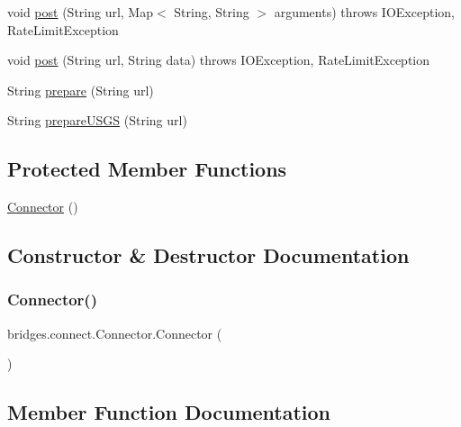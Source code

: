 \begin{DoxyCompactItemize}
\item 
void \hyperlink{classbridges_1_1connect_1_1_connector_a95fdd8c6455e49dbdf15f9ae8594ce23}{post} (String url, Map$<$ String, String $>$ arguments)  throws I\+O\+Exception, Rate\+Limit\+Exception 
\item 
void \hyperlink{classbridges_1_1connect_1_1_connector_ad1384f2afce76b32e0a465d94e1af213}{post} (String url, String data)  throws I\+O\+Exception,  								\+Rate\+Limit\+Exception 
\item 
String \hyperlink{classbridges_1_1connect_1_1_connector_a507ee5a9d8c812ffd4629cbd22f27373}{prepare} (String url)
\item 
String \hyperlink{classbridges_1_1connect_1_1_connector_aa0201e2569358ff906d3c14d654711e5}{prepare\+U\+S\+GS} (String url)
\end{DoxyCompactItemize}
\subsection*{Protected Member Functions}
\begin{DoxyCompactItemize}
\item 
\hyperlink{classbridges_1_1connect_1_1_connector_a167800699b2d191bd625d9c8c8cd9e6f}{Connector} ()
\end{DoxyCompactItemize}


\subsection{Constructor \& Destructor Documentation}
\hypertarget{classbridges_1_1connect_1_1_connector_a167800699b2d191bd625d9c8c8cd9e6f}{}\label{classbridges_1_1connect_1_1_connector_a167800699b2d191bd625d9c8c8cd9e6f} 
\subsubsection{\texorpdfstring{Connector()}{Connector()}}
{\footnotesize\ttfamily bridges.\+connect.\+Connector.\+Connector (\begin{DoxyParamCaption}{ }\end{DoxyParamCaption})\hspace{0.3cm}{\ttfamily [protected]}}



\subsection{Member Function Documentation}
\hypertarget{classbridges_1_1connect_1_1_connector_aa5bd647713545fa24c6d730eacb6bc54}{}\label{classbridges_1_1connect_1_1_connector_aa5bd647713545fa24c6d730eacb6bc54} 
